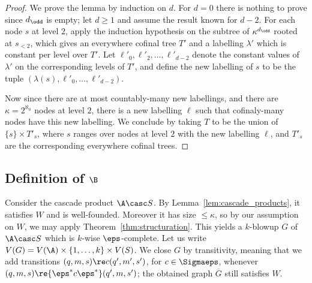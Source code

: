 \begin{proof}
    We prove the lemma by induction on $d$.
    For $d=0$ there is nothing to prove since $d_\odd$ is empty; let $d\geq 1$ and assume the result known for $d-2$.
    For each node $s$ at level $2$, apply the induction hypothesis on the subtree of $\kappa^{d_\odd}$ rooted at $s_{<2}$,
    which gives an everywhere cofinal tree $T'$ and a labelling $\lambda'$ which is constant per level over $T'$.
    Let $\ell'_0,\ell'_2,\dots,\ell'_{d-2}$ denote the constant values of $\lambda'$ on the corresponding levels of $T'$, and define the new labelling of $s$ to be the tuple $(\lambda(s),\ell'_0,\dots,\ell'_{d-2})$.

    Now since there are at most countably-many new labellings, and there are $\kappa=2^{\aleph_0}$ nodes at level $2$, there is a new labelling $\ell$ such that cofinaly-many nodes have this new labelling.
    We conclude by taking $T$ to be the union of $\{s\} \times T'_s$, where $s$ ranges over nodes at level $2$ with the new labelling $\ell$, and $T'_s$ are the corresponding everywhere cofinal trees.
\end{proof}

\subsection{Definition of $\B$}

Consider the cascade product $\A \casc S$. 
By Lemma~\ref{lem:cascade_products}, it satisfies $W$ and is well-founded.
Moreover it has size $\leq \kappa$, so by our assumption on $W$, we may apply Theorem~\ref{thm:structuration}.
This yields a $k$-blowup $G$ of ${\A \casc S}$ which is $k$-wise $\eps$-complete.
Let us write $V(G) = V(\A) \times \{1,\dots,k\} \times V(S)$.
We close $G$ by transitivity, meaning that we add transitions $(q,m,s) \re c (q',m',s')$, for $c \in \Sigmaeps$, whenever $(q,m,s) \re{\eps^* c \eps^*} (q',m,s')$; the obtained graph $\overline{G}$ still satisfies $W$.


